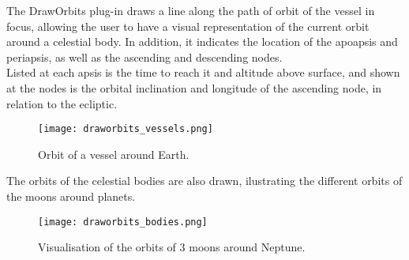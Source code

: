 \documentclass[Orbiter User Manual.tex]{subfiles}
\begin{document}
\noindent
The DrawOrbits plug-in draws a line along the path of orbit of the vessel in focus, allowing the user to have a visual representation of the current orbit around a celestial body. In addition, it indicates the location of the apoapsis and periapsis, as well as the ascending and descending nodes.\\
Listed at each apsis is the time to reach it and altitude above surface, and shown at the nodes is the orbital inclination and longitude of the ascending node, in relation to the ecliptic.

\begin{figure}[H]
	\centering
	\texttt{[image: draworbits\_vessels.png]}
	\caption{Orbit of a vessel around Earth.}
\end{figure}

\noindent
The orbits of the celestial bodies are also drawn, ilustrating the different orbits of the moons around planets.

\begin{figure}[H]
	\centering
	\texttt{[image: draworbits\_bodies.png]}
	\caption{Visualisation of the orbits of 3 moons around Neptune.}
\end{figure}
\end{document}
